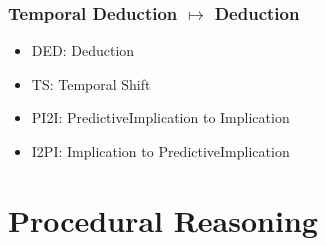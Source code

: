 \documentclass[aspectratio=169]{beamer}
\begin{document}
\begin{frame}
  \frametitle{Temporal Deduction $\mapsto$ Deduction}
  {\small
    \begin{prooftree}
    \end{prooftree}}

  \begin{itemize}
  \item DED: Deduction
  \item TS: Temporal Shift
  \item PI2I: PredictiveImplication to Implication
  \item I2PI: Implication to PredictiveImplication
  \end{itemize}
\end{frame}

\section{Procedural Reasoning}
\end{document}
